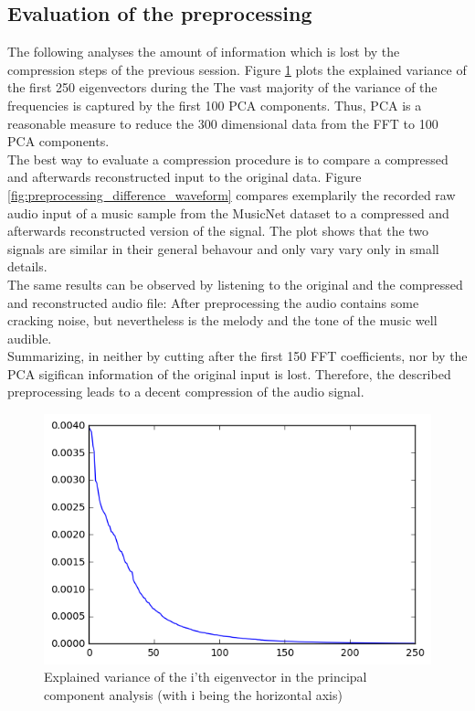 \documentclass[10pt,conference,compsocconf]{IEEEtran}
\begin{document}
\subsection{Evaluation of the preprocessing}
The following analyses the amount of information which is lost by the compression steps of the previous session. Figure \ref{fig:pca_explained_variance} plots the explained variance of the first 250 eigenvectors during the The vast majority of the variance of the frequencies is captured by the first 100 PCA components. Thus, PCA is a reasonable measure to reduce the 300 dimensional data from the FFT to 100 PCA components.\\
The best way to evaluate a compression procedure is to compare a compressed and afterwards reconstructed input to the original data. Figure \ref{fig:preprocessing_difference_waveform} compares exemplarily the recorded raw audio input of a music sample from the MusicNet dataset to a compressed and afterwards reconstructed version of the signal. The plot shows that the two signals are similar in their general behavour and only vary vary only in small details.\\
The same results can be observed by listening to the original and the compressed and reconstructed audio file: After preprocessing the audio contains some cracking noise, but nevertheless is the melody and the tone of the music well audible.\\
Summarizing, in neither by cutting after the first 150 FFT coefficients, nor by the PCA sigifican information of the original input is lost. Therefore, the described preprocessing leads to a decent compression of the audio signal.\\






\begin{figure}[htbp]
  \centering
  \includegraphics[width=\columnwidth]{figures/pca_explained_variance}
  \caption{Explained variance of the i'th eigenvector in the principal component analysis (with i being the horizontal axis)}
  \label{fig:pca_explained_variance}
\end{figure}
\end{document}
